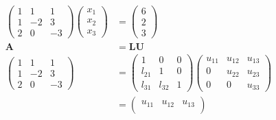\documentclass{article}
\begin{document}
\begin{align*}
  \begin{pmatrix}
    1 & 1  & 1  \\
    1 & -2 & 3  \\
    2 & 0  & -3
  \end{pmatrix} \begin{pmatrix}
                  x_1 \\
                  x_2 \\
                  x_3
                \end{pmatrix} & = \begin{pmatrix}
                                    6 \\
                                    2 \\
                                    3
                                  \end{pmatrix}                                                                           \\
  \mathbf{A}                    & = \mathbf{L U}                                                                           \\
  \begin{pmatrix}
    1 & 1  & 1  \\
    1 & -2 & 3  \\
    2 & 0  & -3
  \end{pmatrix}               & = \begin{pmatrix}
                                    1      & 0      & 0 \\
                                    l_{21} & 1      & 0 \\
                                    l_{31} & l_{32} & 1
                                  \end{pmatrix} \begin{pmatrix}
                                                  u_{11} & u_{12} & u_{13} \\
                                                  0      & u_{22} & u_{23} \\
                                                  0      & 0      & u_{33}
                                                \end{pmatrix}                                                   \\
                                & = \begin{pmatrix}
                                      u_{11}        & u_{12}                        & u_{13}                                 \\

\end{pmatrix}
\end{align*}
\end{document}
